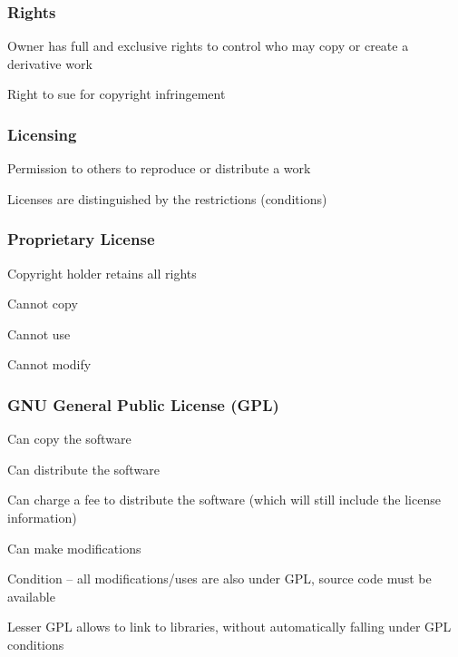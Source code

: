 \documentclass[t,12pt,numbers,fleqn]{beamer}
\begin{document}

\begin{frame}
\frametitle{Rights}

\bi
\item Owner has full and exclusive rights to control who may copy or create a
  derivative work
\item Right to sue for copyright infringement
\ei

\end{frame}


\begin{frame}
\frametitle{Licensing}

\bi
\item Permission to others to reproduce or distribute a work
\item Licenses are distinguished by the restrictions (conditions)
\ei

\end{frame}


\begin{frame}
\frametitle{Proprietary License}

\bi
\item Copyright holder retains all rights
\item Cannot copy
\item Cannot use
\item Cannot modify
\ei

\end{frame}


\begin{frame}
\frametitle{GNU General Public License (GPL)}

\bi
\item Can copy the software
\item Can distribute the software
\item Can charge a fee to distribute the software (which will still include the license information)
\item Can make modifications
\item Condition -- all modifications/uses are also under GPL, source
  code must be available
\item Lesser GPL allows to link to libraries, without automatically falling under
  GPL conditions
\ei

\end{frame}
\end{document}
